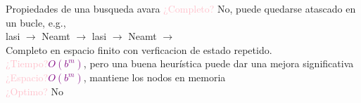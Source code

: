     \begin{frame}{Propiedades de una busqueda avara}
        \textcolor{Pink}{¿Completo?} No, puede quedarse atascado en un bucle, e.g.,\\
        lasi $\longrightarrow$ Neamt $\longrightarrow$ lasi $\longrightarrow$ Neamt $\longrightarrow$\\
        Completo en espacio finito con verficacion de estado repetido.\\
        \textcolor{Pink}{¿Tiempo?}\textcolor{Purple}{$O(b^m)$}, pero una buena heurística puede dar una mejora significativa\\
        \textcolor{Pink}{¿Espacio?}\textcolor{Purple}{$O(b^m)$}, mantiene los nodos en memoria\\
        \textcolor{Pink}{¿Optimo?} No
    \end{frame}
